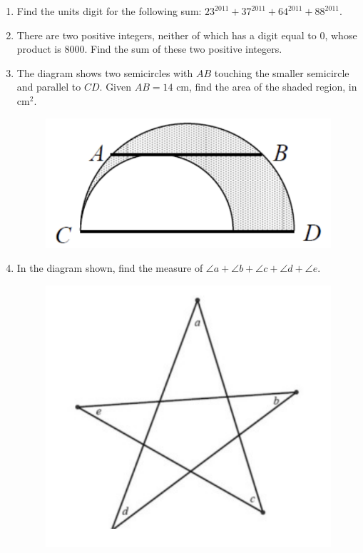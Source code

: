 \documentclass[11pt]{scrartcl}
\begin{document}
\begin{enumerate}
\item Find the units digit for the following sum: $23^{2011} + 37^{2011}  + 64^{2011}  + 88^{2011} $. 

\item There are two positive integers, neither of which has a digit equal to $0$, whose product is $8000$. Find the sum of these two positive integers. 

\item The diagram shows two semicircles with $AB$ touching the smaller semicircle and parallel to $CD$. Given $AB = 14$ cm, find the area of the shaded region, in cm$^2$. 
\begin{figure}[h]
    \centering
    \includegraphics[scale=0.5]{Test For Pelatihan/TryOut OSN SD/semiCircle.png}
    \label{fig:enter-label}
\end{figure}

\item In the diagram shown, find the measure of $\angle a +\angle b +\angle c +\angle d +\angle e$.
\begin{figure}[h]
    \centering
    \includegraphics[scale=0.7]{Test For Pelatihan/TryOut OSN SD/star.png}
    \label{fig:enter-label}
\end{figure}


\end{enumerate}
\end{document}
